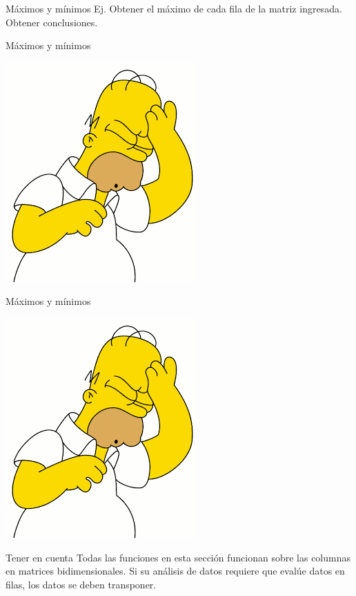 \documentclass{bredelebeamer}
\begin{document}
\begin{frame}{Máximos y mínimos}
Ej. Obtener el máximo de cada fila de la matriz ingresada. Obtener conclusiones.
\end{frame}


\begin{frame}{Máximos y mínimos}
\begin{center}
\includegraphics[scale=0.4]{images/img41.png}
\end{center}
\end{frame}

\begin{frame}{Máximos y mínimos}
\begin{center}
\includegraphics[scale=0.4]{images/img41.png}
\end{center}
\begin{alertblock}{Tener en cuenta}
Todas las funciones en esta sección funcionan sobre las columnas en matrices bidimensionales. Si su análisis de datos requiere que evalúe datos en filas, los datos se deben transponer.
\end{alertblock}
\end{frame}
\end{document}
